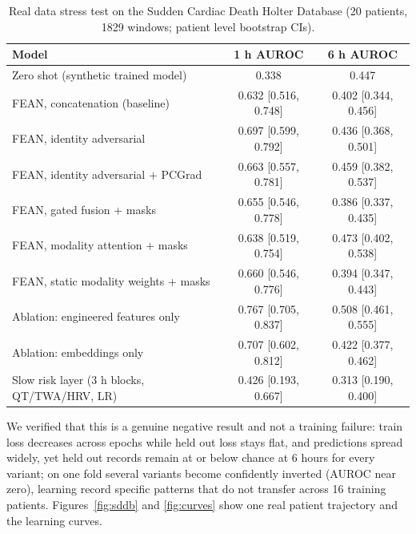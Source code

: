 \documentclass[11pt]{article}
\begin{document}
\begin{table}[t]
\centering
\caption{Real data stress test on the Sudden Cardiac Death Holter Database
(20 patients, 1829 windows; patient level bootstrap CIs).}
\label{tab:sddb}
\begin{tabular}{lcc}
\toprule
Model & 1 h AUROC & 6 h AUROC \\
\midrule
Zero shot (synthetic trained model) & 0.338 & 0.447 \\
FEAN, concatenation (baseline) & 0.632 [0.516, 0.748] & 0.402 [0.344, 0.456] \\
FEAN, identity adversarial & 0.697 [0.599, 0.792] & 0.436 [0.368, 0.501] \\
FEAN, identity adversarial + PCGrad & 0.663 [0.557, 0.781] & 0.459 [0.382, 0.537] \\
FEAN, gated fusion + masks & 0.655 [0.546, 0.778] & 0.386 [0.337, 0.435] \\
FEAN, modality attention + masks & 0.638 [0.519, 0.754] & 0.473 [0.402, 0.538] \\
FEAN, static modality weights + masks & 0.660 [0.546, 0.776] & 0.394 [0.347, 0.443] \\
Ablation: engineered features only & 0.767 [0.705, 0.837] & 0.508 [0.461, 0.555] \\
Ablation: embeddings only & 0.707 [0.602, 0.812] & 0.422 [0.377, 0.462] \\
Slow risk layer (3 h blocks, QT/TWA/HRV, LR) & 0.426 [0.193, 0.667] & 0.313 [0.190, 0.400] \\
\bottomrule
\end{tabular}
\end{table}

We verified that this is a genuine negative result and not a training failure:
train loss decreases across epochs while held out loss stays flat, and
predictions spread widely, yet held out records remain at or below chance at
6 hours for every variant; on one fold several variants become confidently
inverted (AUROC near zero), learning record specific patterns that do not
transfer across 16 training patients. Figures~\ref{fig:sddb} and
\ref{fig:curves} show one real patient trajectory and the learning curves.
\end{document}
